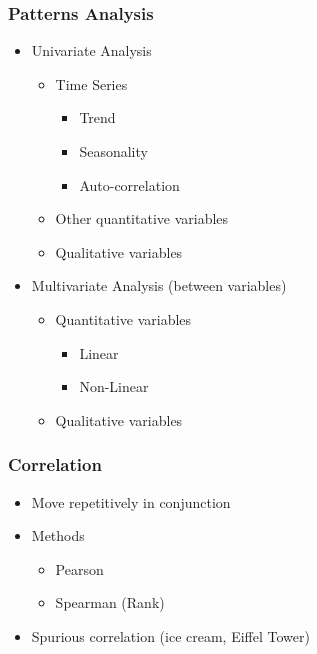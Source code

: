\begin{frame}\frametitle{Patterns Analysis}
   \begin{itemize}
      \item Univariate Analysis
      \begin{itemize}
         \item Time Series
         \begin{itemize}
            \item Trend
            \item Seasonality
            \item Auto-correlation
         \end{itemize}
         \item Other quantitative variables
         \item Qualitative variables
      \end{itemize}
      \item Multivariate Analysis (between variables)
      \begin{itemize}
         \item Quantitative variables
         \begin{itemize}
            \item Linear
            \item Non-Linear
         \end{itemize}
         \item Qualitative variables
      \end{itemize}
   \end{itemize}
\end{frame}

\begin{frame}\frametitle{Correlation}
   \begin{itemize}
      \item Move repetitively in conjunction
      \item Methods
      \begin{itemize}
         \item Pearson
         \item Spearman (Rank)
      \end{itemize}
      \item Spurious correlation (ice cream, Eiffel Tower)
   \end{itemize}
\end{frame}


